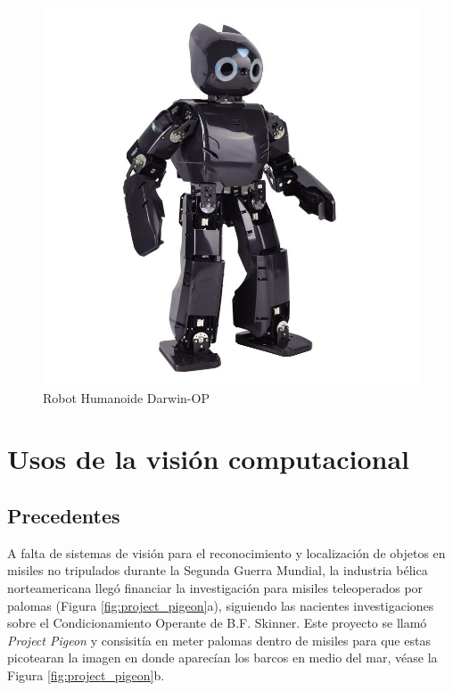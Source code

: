 \begin{figure}
\centering
\includegraphics[scale=0.25]{images/Darwin_OP.jpg}
\caption{Robot Humanoide Darwin-OP}
\label{fig:Darwin_OP}
\end{figure}

	\section{Usos de la visión computacional}
		\subsection*{Precedentes }
	A falta de sistemas de visión para el reconocimiento y localización de objetos en misiles no tripulados durante la Segunda Guerra Mundial, la industria bélica norteamericana llegó financiar la investigación para misiles teleoperados por palomas (Figura \ref{fig:project_pigeon}a), siguiendo las nacientes investigaciones sobre el Condicionamiento Operante de B.F. Skinner. Este proyecto se llamó \textit{Project Pigeon}  \citep{capshew1993engineering} y consisitía en meter palomas dentro de misiles para que estas picotearan la imagen en donde aparecían los barcos en medio del mar, véase la Figura \ref{fig:project_pigeon}b.

